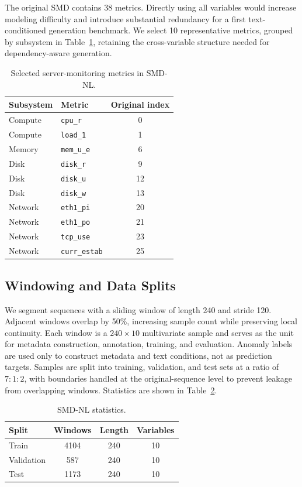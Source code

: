 \documentclass[conference]{IEEEtran}
\begin{document}
The original SMD contains 38 metrics. Directly using all variables would increase modeling difficulty and introduce substantial redundancy for a first text-conditioned generation benchmark. We select 10 representative metrics, grouped by subsystem in Table~\ref{tab:selected_metrics}, retaining the cross-variable structure needed for dependency-aware generation.

\begin{table}[t]
\centering
\caption{Selected server-monitoring metrics in SMD-NL.}
\label{tab:selected_metrics}
\begin{tabular}{llc}
\toprule
Subsystem & Metric & Original index \\
\midrule
Compute & \texttt{cpu\_r} & 0 \\
Compute & \texttt{load\_1} & 1 \\
Memory & \texttt{mem\_u\_e} & 6 \\
Disk & \texttt{disk\_r} & 9 \\
Disk & \texttt{disk\_u} & 12 \\
Disk & \texttt{disk\_w} & 13 \\
Network & \texttt{eth1\_pi} & 20 \\
Network & \texttt{eth1\_po} & 21 \\
Network & \texttt{tcp\_use} & 23 \\
Network & \texttt{curr\_estab} & 25 \\
\bottomrule
\end{tabular}
\end{table}

\subsection{Windowing and Data Splits}

We segment sequences with a sliding window of length 240 and stride 120. Adjacent windows overlap by 50\%, increasing sample count while preserving local continuity. Each window is a $240\times10$ multivariate sample and serves as the unit for metadata construction, annotation, training, and evaluation. Anomaly labels are used only to construct metadata and text conditions, not as prediction targets. Samples are split into training, validation, and test sets at a ratio of $7:1:2$, with boundaries handled at the original-sequence level to prevent leakage from overlapping windows. Statistics are shown in Table~\ref{tab:dataset_stats}.

\begin{table}[t]
\centering
\caption{SMD-NL statistics.}
\label{tab:dataset_stats}
\begin{tabular}{lccc}
\toprule
Split & Windows & Length & Variables \\
\midrule
Train & 4104 & 240 & 10 \\
Validation & 587 & 240 & 10 \\
Test & 1173 & 240 & 10 \\
\bottomrule
\end{tabular}
\end{table}
\end{document}
